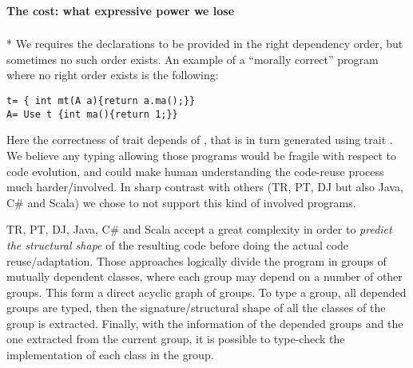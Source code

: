 \paragraph{The cost: what expressive power we lose}${}_{}$\\*
We requires the declarations to be provided in the right dependency order, but sometimes no such order exists.
An example of a ``morally correct'' program where no right order exists is the following:
\saveSpace\saveSpace\begin{lstlisting}
t= { int mt(A a){return a.ma();}}
A= Use t {int ma(){return 1;}}
\end{lstlisting}\saveSpace\saveSpace
Here the correctness of trait \Q@t@ depends of 
\Q@A@, that is in turn generated using trait \Q@t@.
We believe any typing allowing those programs would be fragile with respect to code evolution,
and could make human understanding the code-reuse process much harder/involved.
%
%
In sharp contrast with others (TR, PT, DJ but also Java, C\# and Scala)
we chose to not support this kind of involved programs.

TR, PT, DJ, Java, C\# and Scala
accept a great complexity in order to \emph{predict the structural shape} of the resulting code before doing the actual code reuse/adaptation.
Those approaches logically divide the program in groups of mutually dependent classes, where each group may depend on a number of other groups.
This form a direct acyclic graph of groups.
To type a group, all depended groups are typed, then
the signature/structural shape of all
the classes of the group is extracted.
Finally, with the information of the depended groups and the one extracted
from the current group, it is possible to type-check the implementation of each class in the group.




